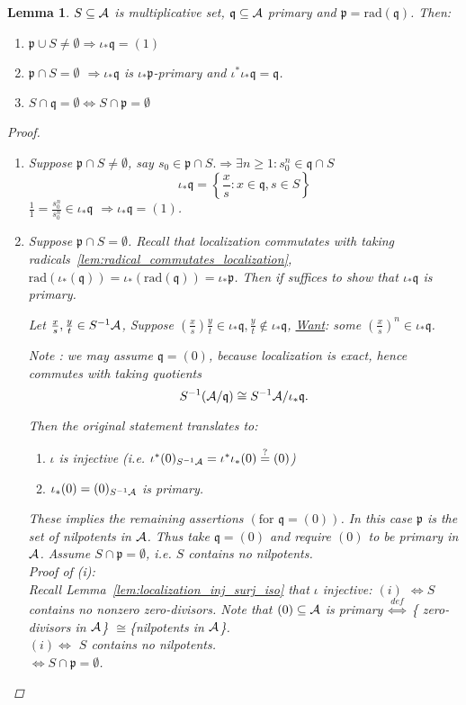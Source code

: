 \documentclass[11pt]{article}
\newtheorem{lemma}[thm]{Lemma}
\newcommand{\scp}{{\mathfrak p}}
\newcommand{\scq}{\mathfrak q}
\newcommand{\cala}{{\cal A}}
\newcommand{\Lrta}{\Longrightarrow}
\newcommand{\Llrta}{\Longleftrightarrow}
\begin{document}
\begin{lemma}\label{lem:second_uniqueness_decomposition}
$S\subseteq \cala$ is multiplicative set, $\scq\subseteq \cala$ primary and $\scp=\text{rad}(\scq)$. Then:
\begin{enumerate}[label=(\alph*)]
\item $\scp\cup S\neq \emptyset \Lrta \iota_*\scq=(1)$
\item $\scp\cap S=\emptyset$ $\Lrta \iota_*\scq$ is $\iota_* \scp$-primary and $\iota^*\iota_* \scq=\scq$.
\item $S\cap \scq =\emptyset \Llrta S\cap \scp=\emptyset$ 
\end{enumerate}
\begin{proof}
\begin{enumerate}[label=(\alph*)]
\item 
Suppose $\scp\cap S\neq \emptyset$, say $s_0\in \scp\cap S.\Lrta \exists n\geq 1: s_0^n\in \scq\cap S$
$$
\iota_*\scq=\left\{\frac{x}{s}:x\in \scq, s\in S\right\}
$$
$\frac{1}{1}=\frac{s_0^n}{s_0^n}\in \iota_*\scq$ $\Lrta\iota_*\scq=(1)$.
\item Suppose $\scp \cap S=\emptyset$. Recall that localization commutates with taking radicals~\ref{lem:radical_commutates_localization}, $\text{rad}(\iota_*(\scq))=\iota_*(\text{rad}(\scq))=\iota_*\scp$. Then if suffices to show that $\iota_*\scq$ is primary. 

Let $\frac{x}{s},\frac{y}{t}\in S^{-1}\cala$, Suppose $(\frac{x}{s})\frac{y}{t}\in \iota_* \scq ,\frac{y}{t}\notin \iota_*\scq$, \underline{Want}: some $(\frac{x}{s})^n\in \iota_*\scq$.

Note : we may assume $\scq=(0)$, because localization is exact, hence commutes with taking quotients
$$
S^{-1}(\cala/\scq)\cong S^{-1}\cala/\iota_*\scq.
$$

Then the original statement translates to:
\begin{enumerate}[label=(\roman*)]
\item $\iota$ is injective  (i.e. $\iota^*(0)_{S^{-1}\cala}=\iota^*\iota_*(0)\overset{?}{=}(0)$)
\item $\iota_*(0)=(0)_{S^{-1}\cala}$ is primary.
\end{enumerate}
These implies the remaining assertions $(\text{for }\scq=(0))$. In this case $\scp$ is the set of nilpotents in $\cala$.
Thus take $\scq=(0)$ and require $(0)$ to be primary in $\cala$. Assume $S\cap \scp=\emptyset$, i.e.  $S$ contains no nilpotents.\\

Proof of (i):\\
Recall Lemma~\ref{lem:localization_inj_surj_iso} that $\iota$ injective: $(i)$ $\Llrta S$ contains no nonzero zero-divisors. Note that $(0)\subseteq \cala$ is primary $\overset{def}{\Llrta}$ \{ zero-divisors in $\cala$\} $\cong$\{nilpotents in $\cala$\}.   \\
$(i)\Llrta$  $S$ contains no nilpotents.\\
$\Llrta S\cap \scp =\emptyset$.


\end{enumerate}
\end{proof}
\end{lemma}
\end{document}
